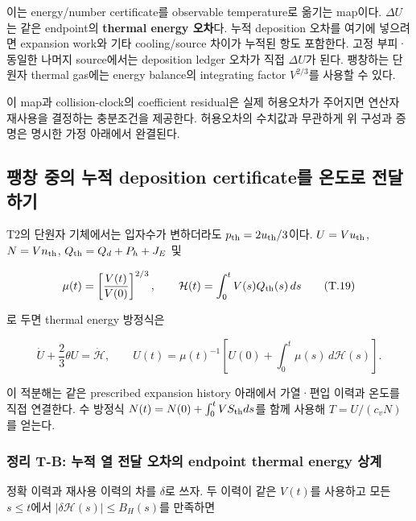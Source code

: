 이는 energy/number certificate를 observable temperature로 옮기는 map이다. \(\Delta U\)는 같은 endpoint의 \textbf{thermal energy 오차}다. 누적 deposition 오차를 여기에 넣으려면 expansion work와 기타 cooling/source 차이가 누적된 항도 포함한다. 고정 부피·동일한 나머지 source에서는 deposition ledger 오차가 직접 \(\Delta U\)가 된다. 팽창하는 단원자 thermal gas에는 energy balance의 integrating factor \(V^{2/3}\)를 사용할 수 있다.

이 map과 collision-clock의 coefficient residual은 실제 허용오차가 주어지면 연산자 재사용을 결정하는 충분조건을 제공한다. 허용오차의 수치값과 무관하게 위 구성과 증명은 명시한 가정 아래에서 완결된다.

\hypertarget{uxd33duxcc3d-uxc911uxc758-uxb204uxc801-deposition-certificateuxb97c-uxc628uxb3c4uxb85c-uxc804uxb2ecuxd558uxae30}{%
\subsection{팽창 중의 누적 deposition certificate를 온도로 전달하기}\label{uxd33duxcc3d-uxc911uxc758-uxb204uxc801-deposition-certificateuxb97c-uxc628uxb3c4uxb85c-uxc804uxb2ecuxd558uxae30}}

T2의 단원자 기체에서는 입자수가 변하더라도 \(p_{\rm th}=2u_{\rm th}/3\)이다. \(U=Vu_{\rm th}\), \(N=Vn_{\rm th}\), \(Q_{\rm th}=Q_d+P_h+J_E\) 및

\[
\mu(t)=\left[\frac{V(t)}{V(0)}\right]^{2/3},\qquad
\mathcal H(t)=\int_0^t V(s)Q_{\rm th}(s)\,ds
\tag{T.19}
\]

로 두면 thermal energy 방정식은

\[
\dot U+\frac23\theta U=\dot{\mathcal H},\qquad
\boxed{U(t)=\mu(t)^{-1}
\left[U(0)+\int_0^t\mu(s)\,d\mathcal H(s)\right]}.
\tag{T.20}
\]

이 적분해는 같은 prescribed expansion history 아래에서 가열·편입 이력과 온도를 직접 연결한다. 수 방정식 \(N(t)=N(0)+\int_0^t VS_{\rm th}ds\)를 함께 사용해 \(T=U/(c_vN)\)를 얻는다.

\hypertarget{uxc815uxb9ac-t-b-uxb204uxc801-uxc5f4-uxc804uxb2ec-uxc624uxcc28uxc758-endpoint-thermal-energy-uxc0c1uxacc4}{%
\subsubsection{정리 T-B: 누적 열 전달 오차의 endpoint thermal energy 상계}\label{uxc815uxb9ac-t-b-uxb204uxc801-uxc5f4-uxc804uxb2ec-uxc624uxcc28uxc758-endpoint-thermal-energy-uxc0c1uxacc4}}

정확 이력과 재사용 이력의 차를 \(\delta\)로 쓰자. 두 이력이 같은 \(V(t)\)를 사용하고 모든 \(s\le t\)에서 \(|\delta\mathcal H(s)|\le B_H(s)\)를 만족하면

